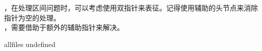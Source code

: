 \documentclass[a4paper,10pt]{article}
\begin{document}
\begin{CJK}{UTF8}{gbsn}     %

\else

，在处理区间问题时，可以考虑使用双指针来表征。记得使用辅助的头节点来消除指针为空的处理。\\

，需要借助于额外的辅助指针来解决。\\

\fi

\ifx allfiles undefined
\end{CJK}
\end{document}
